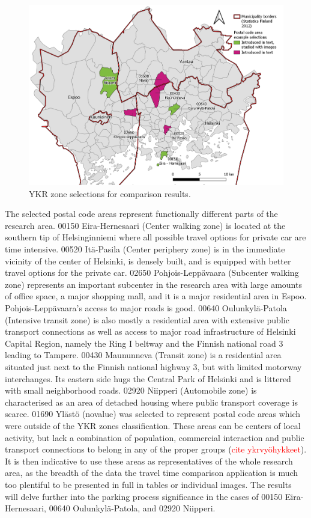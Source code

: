 \begin{figure}[H]%
    \centering
    \includegraphics[width=\textwidth]{images/results_comparison_examplezips.png}
    \caption[YKR zone selections for comparison results]{YKR zone selections for comparison results.}%
    \label{fig:ykrzone_selections_map}%
\end{figure}

The selected postal code areas represent functionally different parts of the research area. 00150 Eira-Hernesaari (Center walking zone) is located at the southern tip of Helsinginniemi where all possible travel options for private car are time intensive. 00520 Itä-Pasila (Center periphery zone) is in the immediate vicinity of the center of Helsinki, is densely built, and is equipped with better travel options for the private car. 02650 Pohjois-Leppävaara (Subcenter walking zone) represents an important subcenter in the research area with large amounts of office space, a major shopping mall, and it is a major residential area in Espoo. Pohjois-Leppävaara's access to major roads is good. 00640 Oulunkylä-Patola (Intensive transit zone) is also mostly a residential area with extensive public transport connections as well as access to major road infrastructure of Helsinki Capital Region, namely the Ring I beltway and the Finnish national road 3 leading to Tampere. 00430 Maununneva (Transit zone) is a residential area situated just next to the Finnish national highway 3, but with limited motorway interchanges. Its eastern side hugs the Central Park of Helsinki and is littered with small neighborhood roads. 02920 Niipperi (Automobile zone) is characterised as an area of detached housing where public transport coverage is scarce. 01690 Ylästö (novalue) was selected to represent postal code areas which were outside of the YKR zones classification. These areas can be centers of local activity, but lack a combination of population, commercial interaction and public transport connections to belong in any of the proper  groups (\textcolor{red}{cite ykrvyöhykkeet}). It is then indicative to use these areas as representatives of the whole research area, as the breadth of the data the travel time comparison application is much too plentiful to be presented in full in tables or individual images. The results will delve further into the parking process significance in the cases of 00150 Eira-Hernesaari, 00640 Oulunkylä-Patola, and 02920 Niipperi.

